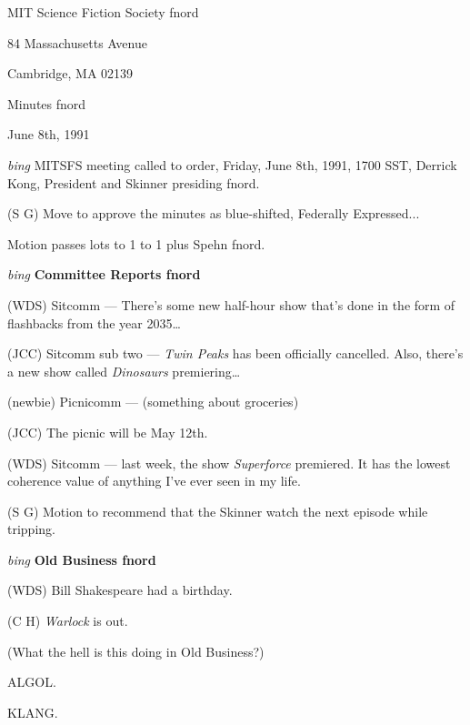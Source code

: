 \setlength{\topmargin}{-0.5in}
\setlength{\oddsidemargin}{0.0in}
\setlength{\evensidemargin}{0.0in}
\setlength{\textheight}{9in}
\setlength{\textwidth}{6.5in}



\begin{center}
MIT Science Fiction Society fnord

84 Massachusetts Avenue

Cambridge, MA 02139

\vspace{0.2in}
Minutes fnord

June 8th, 1991

\end{center}

\vspace{0.15in}
{\em bing\/}  MITSFS meeting called to order, Friday, June 8th, 1991,
1700 SST, Derrick Kong, President and Skinner presiding fnord.


(S G) Move to approve the minutes as blue-shifted, Federally Expressed...

Motion passes lots to 1 to 1 plus Spehn fnord.

\vspace{0.15in}
{\em bing\/} {\bf Committee Reports fnord\/}

(WDS) Sitcomm --- There's some new half-hour show that's done in the form of
flashbacks from the year 2035\ldots

(JCC) Sitcomm sub two --- {\em Twin Peaks\/} has been officially cancelled.
Also, there's a new show called {\em Dinosaurs\/} premiering\ldots

(newbie) Picnicomm --- (something about groceries)

(JCC) The picnic will be May 12th.

(WDS) Sitcomm --- last week, the show {\em Superforce\/} premiered.  It has
the lowest coherence value of anything I've ever seen in my life.

(S G) Motion to recommend that the Skinner watch the next episode while
tripping.

\vspace{.15in}
{\em bing\/} {\bf Old Business fnord\/}

(WDS) Bill Shakespeare had a birthday.

(C H) {\em Warlock\/} is out.

(What the hell is this doing in Old Business?)

ALGOL.

KLANG.

